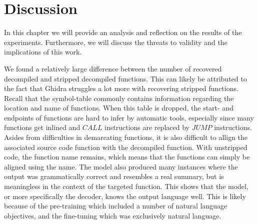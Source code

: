 \chapter{Discussion}
\label{discussion}
In this chapter we will provide an analysis and reflection on the results of the experiments. Furthermore, we will discuss the threats to validity and the implications of this work.

We found a relatively large difference between the number of recovered decompiled and stripped decompiled functions. This can likely be attributed to the fact that Ghidra struggles a lot more with recovering stripped functions. Recall that the symbol-table commonly contains information regarding the location and name of functions. When this table is dropped, the start- and endpoints of functions are hard to infer by automatic tools, especially since many functions get inlined and \(CALL\) instructions are replaced by \(JUMP\) instructions. Asides from difficulties in demarcating functions, it is also difficult to allign the associated source code function with the decompiled function. With unstripped code, the function name remains, which means that the functions can simply be aligned using the name.
The model also produced many instances where the output was grammatically correct and resembles a real summary, but is meaningless in the context of the targeted function. This shows that the model, or more specifically the decoder, knows the output language well. This is likely because of the pre-training which included a number of natural language objectives, and the fine-tuning which was exclusively natural language.


